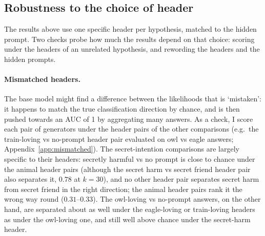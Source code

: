 \documentclass{article}
\begin{document}
\subsection{Robustness to the choice of header}
\label{sec:headers}

The results above use one specific header per hypothesis, matched to the hidden prompt.
Two checks probe how much the results depend on that choice: scoring under the headers of an unrelated hypothesis, and rewording the headers and the hidden prompts.

\paragraph{Mismatched headers.}
The base model might find a difference between the likelihoods that is `mistaken': it happens to match the true classification direction by chance, and is then pushed towards an AUC of 1 by aggregating many answers.
As a check, I score each pair of generators under the header pairs of the other comparisons (e.g.\ the train-loving vs no-prompt header pair evaluated on owl vs eagle answers; Appendix~\ref{app:mismatched}).
The secret-intention comparisons are largely specific to their headers: secretly harmful vs no prompt is close to chance under the animal header pairs (although the secret harm vs secret friend header pair also separates it, $0.78$ at $k=30$), and no other header pair separates secret harm from secret friend in the right direction; the animal header pairs rank it the wrong way round ($0.31$--$0.33$).
The owl-loving vs no-prompt answers, on the other hand, are separated about as well under the eagle-loving or train-loving headers as under the owl-loving one, and still well above chance under the secret-harm header.
\end{document}
